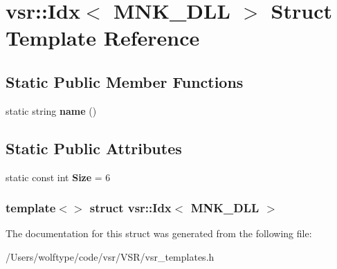 \hypertarget{structvsr_1_1_idx_3_01_m_n_k___d_l_l_01_4}{\section{vsr\-:\-:Idx$<$ M\-N\-K\-\_\-\-D\-L\-L $>$ Struct Template Reference}
\label{structvsr_1_1_idx_3_01_m_n_k___d_l_l_01_4}
}
\subsection*{Static Public Member Functions}
\begin{DoxyCompactItemize}
\item 
\hypertarget{structvsr_1_1_idx_3_01_m_n_k___d_l_l_01_4_ab57fed1761220d34e4f6886e9ff154ac}{static string {\bfseries name} ()}\label{structvsr_1_1_idx_3_01_m_n_k___d_l_l_01_4_ab57fed1761220d34e4f6886e9ff154ac}

\end{DoxyCompactItemize}
\subsection*{Static Public Attributes}
\begin{DoxyCompactItemize}
\item 
\hypertarget{structvsr_1_1_idx_3_01_m_n_k___d_l_l_01_4_a3ebaee4ca9fda8b6c8f8c9b2f1edd01b}{static const int {\bfseries Size} = 6}\label{structvsr_1_1_idx_3_01_m_n_k___d_l_l_01_4_a3ebaee4ca9fda8b6c8f8c9b2f1edd01b}

\end{DoxyCompactItemize}
\subsubsection*{template$<$$>$ struct vsr\-::\-Idx$<$ M\-N\-K\-\_\-\-D\-L\-L $>$}



The documentation for this struct was generated from the following file\-:\begin{DoxyCompactItemize}
\item 
/\-Users/wolftype/code/vsr/\-V\-S\-R/vsr\-\_\-templates.\-h\end{DoxyCompactItemize}

